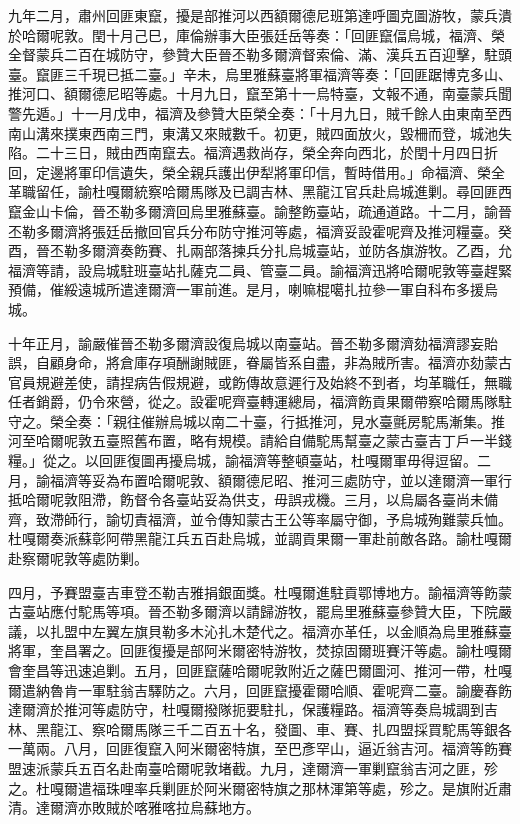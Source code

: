 \begin{pinyinscope}
九年二月，肅州回匪東竄，擾是部推河以西額爾德尼班第達呼圖克圖游牧，蒙兵潰於哈爾呢敦。閏十月己巳，庫倫辦事大臣張廷岳等奏：「回匪竄偪烏城，福濟、榮全督蒙兵二百在城防守，參贊大臣晉丕勒多爾濟督索倫、滿、漢兵五百迎擊，駐頭臺。竄匪三千現已抵二臺。」辛未，烏里雅蘇臺將軍福濟等奏：「回匪踞博克多山、推河口、額爾德尼昭等處。十月九日，竄至第十一烏特臺，文報不通，南臺蒙兵聞警先遁。」十一月戊申，福濟及參贊大臣榮全奏：「十月九日，賊千餘人由東南至西南山溝來撲東西南三門，東溝又來賊數千。初更，賊四面放火，毀柵而登，城池失陷。二十三日，賊由西南竄去。福濟遇救尚存，榮全奔向西北，於閏十月四日折回，定邊將軍印信遺失，榮全親兵護出伊犁將軍印信，暫時借用。」命福濟、榮全革職留任，諭杜嘎爾統察哈爾馬隊及已調吉林、黑龍江官兵赴烏城進剿。尋回匪西竄金山卡倫，晉丕勒多爾濟回烏里雅蘇臺。諭整飭臺站，疏通道路。十二月，諭晉丕勒多爾濟將張廷岳撤回官兵分布防守推河等處，福濟妥設霍呢齊及推河糧臺。癸酉，晉丕勒多爾濟奏飭賽、扎兩部落揀兵分扎烏城臺站，並防各旗游牧。乙酉，允福濟等請，設烏城駐班臺站扎薩克二員、管臺二員。諭福濟迅將哈爾呢敦等臺趕緊預備，催綏遠城所遣達爾濟一軍前進。是月，喇嘛棍噶扎拉參一軍自科布多援烏城。

十年正月，諭嚴催晉丕勒多爾濟設復烏城以南臺站。晉丕勒多爾濟劾福濟謬妄貽誤，自顧身命，將倉庫存項酬謝賊匪，眷屬皆系自盡，非為賊所害。福濟亦劾蒙古官員規避差使，請捏病告假規避，或飭傳故意遲行及始終不到者，均革職任，無職任者銷爵，仍令來營，從之。設霍呢齊臺轉運總局，福濟飭貢果爾帶察哈爾馬隊駐守之。榮全奏：「親往催辦烏城以南二十臺，行抵推河，見水臺氈房駝馬漸集。推河至哈爾呢敦五臺照舊布置，略有規模。請給自備駝馬幫臺之蒙古臺吉丁戶一半錢糧。」從之。以回匪復圖再擾烏城，諭福濟等整頓臺站，杜嘎爾軍毋得逗留。二月，諭福濟等妥為布置哈爾呢敦、額爾德尼昭、推河三處防守，並以達爾濟一軍行抵哈爾呢敦阻滯，飭督令各臺站妥為供支，毋誤戎機。三月，以烏屬各臺尚未備齊，致滯師行，諭切責福濟，並令傳知蒙古王公等率屬守御，予烏城殉難蒙兵恤。杜嘎爾奏派蘇彰阿帶黑龍江兵五百赴烏城，並調貢果爾一軍赴前敵各路。諭杜嘎爾赴察爾呢敦等處防剿。

四月，予賽盟臺吉車登丕勒吉雅捐銀面獎。杜嘎爾進駐貢鄂博地方。諭福濟等飭蒙古臺站應付駝馬等項。晉丕勒多爾濟以請歸游牧，罷烏里雅蘇臺參贊大臣，下院嚴議，以扎盟中左翼左旗貝勒多木沁扎木楚代之。福濟亦革任，以金順為烏里雅蘇臺將軍，奎昌署之。回匪復擾是部阿米爾密特游牧，焚掠固爾班賽汗等處。諭杜嘎爾會奎昌等迅速追剿。五月，回匪竄薩哈爾呢敦附近之薩巴爾圖河、推河一帶，杜嘎爾遣納魯肯一軍駐翁吉驛防之。六月，回匪竄擾霍爾哈順、霍呢齊二臺。諭慶春飭達爾濟於推河等處防守，杜嘎爾撥隊扼要駐扎，保護糧路。福濟等奏烏城調到吉林、黑龍江、察哈爾馬隊三千二百五十名，發圖、車、賽、扎四盟採買駝馬等銀各一萬兩。八月，回匪復竄入阿米爾密特旗，至巴彥罕山，逼近翁吉河。福濟等飭賽盟速派蒙兵五百名赴南臺哈爾呢敦堵截。九月，達爾濟一軍剿竄翁吉河之匪，殄之。杜嘎爾遣福珠哩率兵剿匪於阿米爾密特旗之那林渾第等處，殄之。是旗附近肅清。達爾濟亦敗賊於喀雅喀拉烏蘇地方。


\end{pinyinscope}
